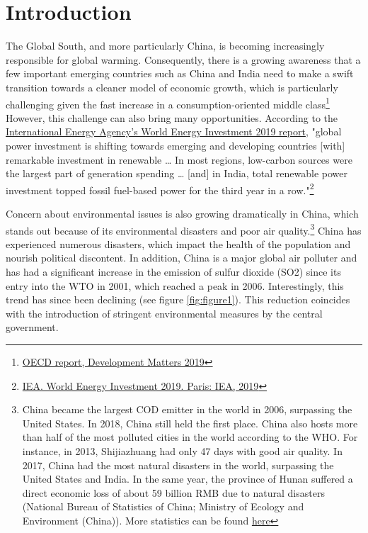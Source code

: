 \documentclass[12pt]{article}
\begin{document}
\doublespacing

\section{Introduction} \label{sec:introduction}

The Global South, and more particularly China, is becoming increasingly responsible for global warming. Consequently, there is a growing awareness that a few important emerging countries such as China and India need to make a swift transition towards a cleaner model of economic growth, which is particularly challenging given the fast increase in a consumption-oriented middle class\footnote{ \href{https://oecd-development-matters.org/2019/06/20/the-global-souths-contribution-to-the-climate-crisis-and-its-potential-solutions/}{OECD report, Development Matters 2019}} However, this challenge can also bring many opportunities. According to the \href{https://www.iea.org/wei2019/}{International Energy Agency’s World Energy Investment 2019 report}, "global power investment is shifting towards emerging and developing countries [with] remarkable investment in renewable … In most regions, low-carbon sources were the largest part of generation spending … [and] in India, total renewable power investment topped fossil fuel-based power for the third year in a row."\footnote{ \href{https://drive.google.com/open?id=16ftB1MMwn9drPqVb1b5O51ODzhPQjiW-}{IEA. World Energy Investment 2019. Paris: IEA, 2019}}

Concern about environmental issues is also growing dramatically in China, which stands out because of its environmental disasters and poor air quality.\footnote{China became the largest COD emitter in the world in 2006, surpassing the United States. In 2018, China still held the first place. China also hosts more than half of the most polluted cities in the world according to the WHO. For instance, in 2013, Shijiazhuang had only 47 days with good air quality. In 2017, China had the most natural disasters in the world, surpassing the United States and India. In the same year, the province of Hunan suffered a direct economic loss of about 59 billion RMB due to natural disasters (National Bureau of Statistics of China; Ministry of Ecology and
Environment (China)). More statistics can be found \href{https://drive.google.com/open?id=1nq-njkZ-TaQyzH30Ncq1R8hlpFE1InSG}{here}
} China has experienced numerous disasters, which impact the health of the population and nourish political discontent. In addition, China is a major global air polluter and has had a significant increase in the emission of sulfur dioxide (SO2) since its entry into the WTO in 2001, which reached a peak in 2006. Interestingly, this trend has since been declining (see figure \ref{fig:figure1}). This reduction coincides with the introduction of stringent environmental measures by the central government.
\end{document}
